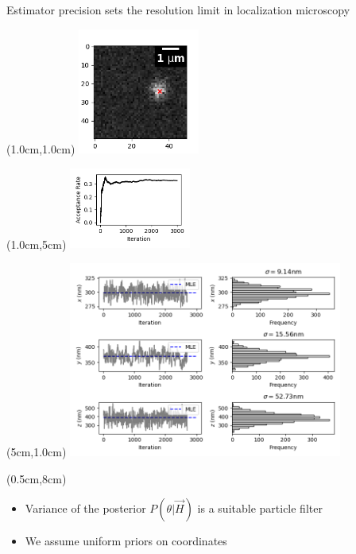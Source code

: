 \documentclass{beamer}					%
\begin{document}
\begin{frame}{Estimator precision sets the resolution limit in localization microscopy}
\begin{textblock*}{4cm}(1.0cm,1.0cm)
\includegraphics[width=4cm]{MCMC/Figure_1.png}
\end{textblock*}
\begin{textblock*}{4cm}(1.0cm,5cm)
\includegraphics[width=4cm]{MCMC/Figure_2.png}
\end{textblock*}
\begin{textblock*}{9cm}(5cm,1.0cm)
\includegraphics[width=9cm]{MCMC/Figure_3.png}
\end{textblock*}
\begin{textblock*}{13cm}(0.5cm,8cm)
\begin{itemize}
\item Variance of the posterior $P(\theta|\vec{H})$ is a suitable particle filter
\item We assume uniform priors on coordinates
\end{itemize}
\end{textblock*}
\end{frame}
\end{document}
